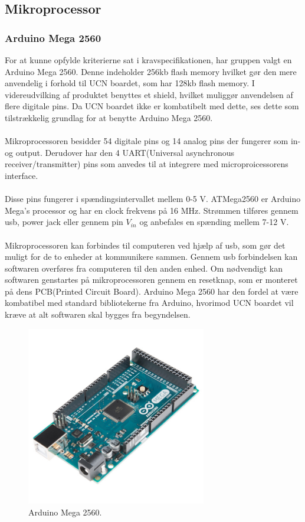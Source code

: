 \subsection{Mikroprocessor}
\subsubsection{Arduino Mega 2560}
For at kunne opfylde kriterierne sat i kravspecifikationen, har gruppen valgt en Arduino Mega 2560. Denne indeholder 256kb flash memory hvilket gør den mere anvendelig i forhold til UCN boardet, som har 128kb flash memory. I videreudvilking af produktet benyttes et shield, hvilket muliggør anvendelsen af flere digitale pins. Da UCN boardet ikke er kombatibelt med dette, ses dette som tilstrækkelig grundlag for at benytte Arduino Mega 2560. 
\\
\\
Mikroprocessoren besidder 54 digitale pins og 14 analog pins der fungerer som in- og output. Derudover har den 4 UART(Universal asynchronous receiver/transmitter) pins som anvedes til at integrere med microproicessorens interface.
\\
\\
Disse pins fungerer i spændingsintervallet mellem 0-5 V. ATMega2560 er Arduino Mega's processor og har en clock frekvens på 16 MHz. Strømmen tilføres gennem usb, power jack eller gennem pin $V_{in}$ og anbefales en spænding mellem 7-12 V. 
\\
\\
Mikroprocessoren kan forbindes til computeren ved hjælp af usb, som gør det muligt for de to enheder at kommunikere sammen. Gennem usb forbindelsen kan softwaren overføres fra computeren til den anden enhed. Om nødvendigt kan softwaren genstartes på mikroprocessoren gennem en resetknap, som er monteret på dens PCB(Printed Circuit Board).
\newline 
Arduino Mega 2560 har den fordel at være kombatibel med standard bibliotekerne fra Arduino, hvorimod UCN boardet vil kræve at alt softwaren skal bygges fra begyndelsen.

\begin{figure}[h!]
  \centering
  \includegraphics[width=0.7\textwidth]{figures/arduinoMega.jpg}
  \caption{Arduino Mega 2560.}
  \label{arduino2569}
\end{figure} 

\newpage



